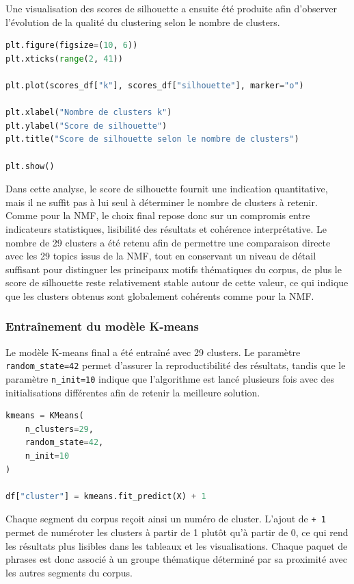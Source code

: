 \documentclass{article}
\begin{document}
Une visualisation des scores de silhouette a ensuite été produite afin d'observer l'évolution de la qualité du clustering selon le nombre de clusters.

\begin{lstlisting}[language=Python, caption={Visualisation du score de silhouette selon le nombre de clusters}]
plt.figure(figsize=(10, 6))
plt.xticks(range(2, 41))

plt.plot(scores_df["k"], scores_df["silhouette"], marker="o")

plt.xlabel("Nombre de clusters k")
plt.ylabel("Score de silhouette")
plt.title("Score de silhouette selon le nombre de clusters")

plt.show()
\end{lstlisting}

Dans cette analyse, le score de silhouette fournit une indication quantitative, mais il ne suffit pas à lui seul à déterminer le nombre de clusters à retenir. Comme pour la NMF, le choix final repose donc sur un compromis entre indicateurs statistiques, lisibilité des résultats et cohérence interprétative. Le nombre de 29 clusters a été retenu afin de permettre une comparaison directe avec les 29 topics issus de la NMF, tout en conservant un niveau de détail suffisant pour distinguer les principaux motifs thématiques du corpus, de plus le score de silhouette reste relativement stable autour de cette valeur, ce qui indique que les clusters obtenus sont globalement cohérents comme pour la NMF.

\subsubsection{Entraînement du modèle K-means}

Le modèle K-means final a été entraîné avec 29 clusters. Le paramètre \texttt{random\_state=42} permet d'assurer la reproductibilité des résultats, tandis que le paramètre \texttt{n\_init=10} indique que l'algorithme est lancé plusieurs fois avec des initialisations différentes afin de retenir la meilleure solution.

\begin{lstlisting}[language=Python, caption={Entraînement du modèle K-means final}]
kmeans = KMeans(
    n_clusters=29,
    random_state=42,
    n_init=10
)

df["cluster"] = kmeans.fit_predict(X) + 1
\end{lstlisting}

Chaque segment du corpus reçoit ainsi un numéro de cluster. L'ajout de \texttt{+ 1} permet de numéroter les clusters à partir de 1 plutôt qu'à partir de 0, ce qui rend les résultats plus lisibles dans les tableaux et les visualisations. Chaque paquet de phrases est donc associé à un groupe thématique déterminé par sa proximité avec les autres segments du corpus.
\end{document}
